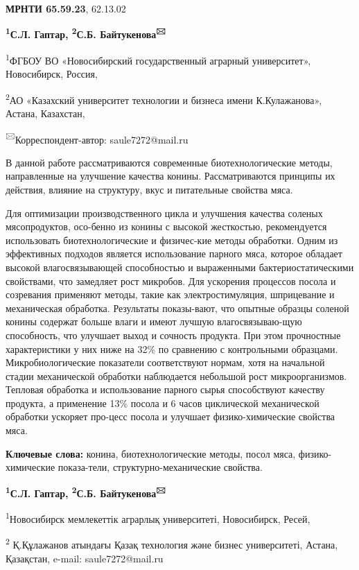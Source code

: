 \newpage
{\bfseries МРНТИ 65.59.23}, 62.13.02

\begin{center}

{\bfseries \textsuperscript{1}С.Л. Гаптар, \textsuperscript{2}С.Б.
Байтукенова\textsuperscript{🖂}}

\textsuperscript{1}ФГБОУ ВО «Новосибирский государственный аграрный
университет», Новосибирск, Россия,

\textsuperscript{2}АО «Казахский университет технологии и бизнеса имени
К.Кулажанова», Астана, Казахстан,
\end{center}

{\textsuperscript{🖂}}Корреспондент-автор: saule7272@mail.ru\vspace{0.5cm}

В данной работе рассматриваются современные биотехнологические методы,
направленные на улучшение качества конины. Рассматриваются принципы их
действия, влияние на структуру, вкус и питательные свойства мяса.

Для оптимизации производственного цикла и улучшения качества соленых
мясопродуктов, осо-бенно из конины с высокой жесткостью, рекомендуется
использовать биотехнологические и физичес-кие методы обработки. Одним из
эффективных подходов является использование парного мяса, которое
обладает высокой влагосвязывающей способностью и выраженными
бактериостатическими свойствами, что замедляет рост микробов. Для
ускорения процессов посола и созревания применяют методы, такие как
электростимуляция, шприцевание и механическая обработка. Результаты
показы-вают, что опытные образцы соленой конины содержат больше влаги и
имеют лучшую влагосвязываю-щую способность, что улучшает выход и сочность
продукта. При этом прочностные характеристики у них ниже на 32\% по
сравнению с контрольными образцами. Микробиологические показатели
соответствуют нормам, хотя на начальной стадии механической обработки
наблюдается небольшой рост микроорганизмов. Тепловая обработка и
использование парного сырья способствуют качеству продукта, а применение
13\% посола и 6 часов циклической механической обработки ускоряет
про-цесс посола и улучшает физико-химические свойства мяса.

{\bfseries Ключевые слова:} конина, биотехнологические методы, посол мяса,
физико-химические показа-тели, структурно-механические свойства.

\begin{center}

{\bfseries \textsuperscript{1}С.Л. Гаптар, \textsuperscript{2}С.Б.
Байтукенова\textsuperscript{🖂}}

\textsuperscript{1}Новосибирск мемлекеттік аграрлық университеті,
Новосибирск, Ресей,

\textsuperscript{2} Қ.Құлажанов атындағы Қазақ технология және бизнес
университеті, Астана, Қазақстан, e-mail: saule7272@mail.ru
\end{center}

